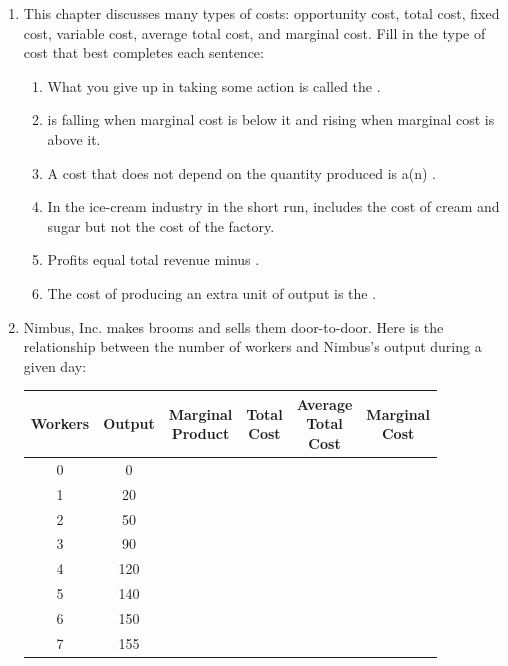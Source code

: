 \documentclass{article}
\begin{document}
\begin{enumerate}

\item This chapter discusses many types of costs: opportunity cost, total cost, fixed cost, variable cost, average total cost, and marginal cost. Fill in the type of cost that best completes each sentence:

	\begin{enumerate}
	
	\item What you give up in taking some action is called the \underline{\phantom{xxxxxxxxxx}}.
	
	\item \underline{\phantom{xxxxxxxxxx}} is falling when marginal cost is below it and rising when marginal cost is above it.
	
	\item A cost that does not depend on the quantity produced is a(n) \underline{\phantom{xxxxxxxxxx}}.
	
	\item In the ice-cream industry in the short run, \underline{\phantom{xxxxxxxxxx}} includes the cost of cream and sugar but not the cost of the factory.
	
	\item Profits equal total revenue minus \underline{\phantom{xxxxxxxxxx}}.
	
	\item The cost of producing an extra unit of output is the \underline{\phantom{xxxxxxxxxx}}.
	
	\end{enumerate}
	
\item Nimbus, Inc. makes brooms and sells them door-to-door. Here is the relationship between the number of workers and Nimbus's output during a given day:

	\begin{center}
	\begin{tabular}{| c | c | c | c | c | c |}
	\hline
	Workers & Output & \makecell{Marginal\\Product} & \makecell{Total\\Cost} & \makecell{Average\\Total\\Cost} & \makecell{Marginal\\Cost} \\
	\hline
	0 & 0 & & & & \\
	\hline
	1 & 20 & & & &\\
	\hline
	2 & 50 & & & &\\
	\hline
	3 & 90 & & & &\\
	\hline
	4 & 120 & & & &\\
	\hline
	5 & 140 & & & &\\
	\hline
	6 & 150 & & & &\\
	\hline
	7 & 155 & & & & \\
	\hline
	\end{tabular}
	\end{center}
	

\end{enumerate}
\end{document}
